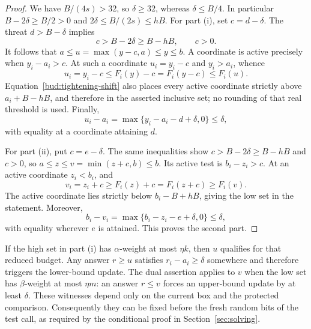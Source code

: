 \begin{proof}
We have $B/(4s)>32$, so $\delta\ge32$, whereas $\delta\le B/4$.
In particular $B-2\delta\ge B/2>0$ and $2\delta\le B/(2s)\le hB$.
For part (i), set $c=d-\delta$. The threat $d>B-\delta$ implies
\begin{equation}\label{bud:tightening-shift}
 c>B-2\delta\ge B-hB,\qquad c>0.
\end{equation}
It follows that $a\le u=\max(y-c,a)\le y\le b$. A coordinate is
active precisely when $y_i-a_i>c$. At such a coordinate $u_i=y_i-c$
and $y_i>a_i$, whence
\[
 u_i=y_i-c\le F_i(y)-c=F_i(y-c)\le F_i(u).
\]
Equation~\eqref{bud:tightening-shift} also places every active coordinate
strictly above $a_i+B-hB$, and therefore in the asserted inclusive
set; no rounding of that real threshold is used. Finally,
\[
 u_i-a_i=\max\{y_i-a_i-d+\delta,0\}\le\delta,
\]
with equality at a coordinate attaining $d$.

For part (ii), put $c=e-\delta$. The same inequalities show
$c>B-2\delta\ge B-hB$ and $c>0$, so $a\le z\le v=\min(z+c,b)\le b$.
Its active test is $b_i-z_i>c$. At an active coordinate $z_i<b_i$,
and
\[
 v_i=z_i+c\ge F_i(z)+c=F_i(z+c)\ge F_i(v).
\]
The active coordinate lies strictly below $b_i-B+hB$, giving the low
set in the statement. Moreover,
\[
 b_i-v_i=\max\{b_i-z_i-e+\delta,0\}\le\delta,
\]
with equality wherever $e$ is attained. This proves the second part.
\end{proof}

If the high set in part (i) has $\alpha$-weight at most $\eta k$, then
$u$ qualifies for that reduced budget. Any answer $r\ge u$ satisfies
$r_i-a_i\ge\delta$ somewhere and therefore triggers the lower-bound
update. The dual assertion applies to $v$ when the low set has
$\beta$-weight at most $\eta m$: an answer $r\le v$ forces an
upper-bound update by at least $\delta$. These witnesses depend only
on the current box and the protected comparison. Consequently they
can be fixed before the fresh random bits of the test call, as required
by the conditional proof in Section~\ref{sec:solving}.

